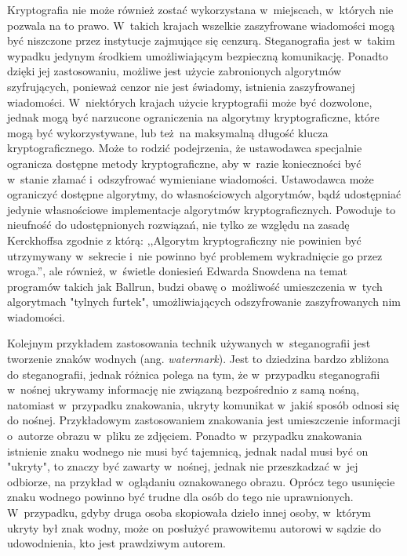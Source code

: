 \documentclass[a4paper, twoside, openright, 12pt]{report}
\begin{document}
        Kryptografia nie może również zostać wykorzystana w~miejscach, w~których
        nie pozwala na to prawo\cite{CRYPTOGRAFYLAW}. W~takich krajach wszelkie
        zaszyfrowane wiadomości mogą być niszczone przez instytucje zajmujące się
        cenzurą. Steganografia jest w~takim
        wypadku jedynym środkiem umożliwiającym bezpieczną komunikację. Ponadto
        dzięki jej zastosowaniu, możliwe jest użycie zabronionych algorytmów szyfrujących,
        ponieważ cenzor nie jest świadomy, istnienia zaszyfrowanej wiadomości.
        W~niektórych krajach użycie kryptografii
        może być dozwolone, jednak mogą być narzucone ograniczenia na algorytmy
        kryptograficzne, które mogą być wykorzystywane, lub też na maksymalną
        długość klucza kryptograficznego. Może to rodzić podejrzenia, że ustawodawca
        specjalnie ogranicza dostępne metody kryptograficzne, aby w~razie konieczności
        być w~stanie złamać i~odszyfrować wymieniane wiadomości. Ustawodawca
        może ograniczyć dostępne algorytmy, do własnościowych algorytmów, bądź
        udostępniać jedynie własnościowe implementacje algorytmów kryptograficznych.
        Powoduje to nieufność do udostępnionych rozwiązań, nie tylko ze względu
        na zasadę Kerckhoffsa zgodnie z którą:
        ,,Algorytm kryptograficzny nie powinien być utrzymywany w~sekrecie i~nie powinno
        być problemem wykradnięcie go przez wroga.''\cite{KERCKHOS}, ale również,
        w~świetle doniesień Edwarda Snowdena na temat programów takich jak
        Ballrun\cite{WIKI:BALLRUN}, budzi obawę o~możliwość umieszczenia w~tych
        algorytmach "tylnych furtek", umożliwiających odszyfrowanie zaszyfrowanych
        nim wiadomości.

        Kolejnym przykładem zastosowania technik używanych w~steganografii jest
        tworzenie znaków wodnych (ang. \emph{watermark}). Jest to dziedzina bardzo zbliżona do steganografii,
        jednak różnica polega na tym, że w~przypadku steganografii w~nośnej ukrywamy
        informację nie związaną bezpośrednio z samą nośną, natomiast w~przypadku znakowania,
        ukryty komunikat w~jakiś sposób odnosi się do nośnej. Przykładowym zastosowaniem
        znakowania jest umieszczenie informacji o~autorze obrazu w~pliku ze zdjęciem.
        Ponadto w~przypadku znakowania istnienie znaku wodnego nie musi być tajemnicą,
        jednak nadal musi być on "ukryty", to znaczy być zawarty w~nośnej, jednak
        nie przeszkadzać w~jej odbiorze, na przykład w~oglądaniu oznakowanego obrazu.
        Oprócz tego usunięcie znaku wodnego powinno być trudne dla osób do tego nie
        uprawnionych. W~przypadku, gdyby druga osoba skopiowała dzieło innej osoby,
        w~którym ukryty był znak wodny, może on posłużyć prawowitemu autorowi w
        sądzie do udowodnienia, kto jest prawdziwym autorem.
\end{document}
